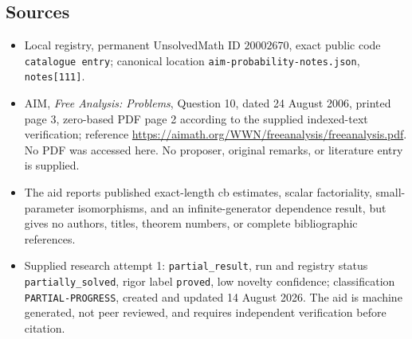 \documentclass[11pt]{article}
\begin{document}
\subsection{Sources}
\begin{itemize}
\item Local registry, permanent UnsolvedMath ID \(20002670\), exact public code \texttt{catalogue entry}; canonical location \texttt{aim-probability-notes.json}, \texttt{notes[111]}.
\item AIM, \emph{Free Analysis: Problems}, Question 10, dated 24 August 2006, printed page 3, zero-based PDF page 2 according to the supplied indexed-text verification; reference \url{https://aimath.org/WWN/freeanalysis/freeanalysis.pdf}. No PDF was accessed here. No proposer, original remarks, or literature entry is supplied.
\item The aid reports published exact-length cb estimates, scalar factoriality, small-parameter isomorphisms, and an infinite-generator dependence result, but gives no authors, titles, theorem numbers, or complete bibliographic references.
\item Supplied research attempt 1: \texttt{partial\_result}, run and registry status \texttt{partially\_solved}, rigor label \texttt{proved}, low novelty confidence; classification \texttt{PARTIAL-PROGRESS}, created and updated 14 August 2026. The aid is machine generated, not peer reviewed, and requires independent verification before citation.
\end{itemize}
\end{document}
